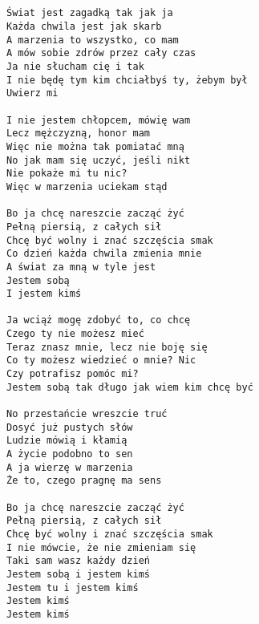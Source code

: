 \documentclass[12pt]{article}
\begin{document}
\subsection*{}
\begin{verbatim}
Świat jest zagadką tak jak ja
Każda chwila jest jak skarb
A marzenia to wszystko, co mam
A mów sobie zdrów przez cały czas
Ja nie słucham cię i tak
I nie będę tym kim chciałbyś ty, żebym był
Uwierz mi

I nie jestem chłopcem, mówię wam
Lecz mężczyzną, honor mam
Więc nie można tak pomiatać mną
No jak mam się uczyć, jeśli nikt
Nie pokaże mi tu nic?
Więc w marzenia uciekam stąd

Bo ja chcę nareszcie zacząć żyć
Pełną piersią, z całych sił
Chcę być wolny i znać szczęścia smak
Co dzień każda chwila zmienia mnie
A świat za mną w tyle jest
Jestem sobą
I jestem kimś

Ja wciąż mogę zdobyć to, co chcę
Czego ty nie możesz mieć
Teraz znasz mnie, lecz nie boję się
Co ty możesz wiedzieć o mnie? Nic
Czy potrafisz pomóc mi?
Jestem sobą tak długo jak wiem kim chcę być

No przestańcie wreszcie truć
Dosyć już pustych słów
Ludzie mówią i kłamią
A życie podobno to sen
A ja wierzę w marzenia
Że to, czego pragnę ma sens

Bo ja chcę nareszcie zacząć żyć
Pełną piersią, z całych sił
Chcę być wolny i znać szczęścia smak
I nie mówcie, że nie zmieniam się
Taki sam wasz każdy dzień
Jestem sobą i jestem kimś
Jestem tu i jestem kimś
Jestem kimś
Jestem kimś
\end{verbatim}
\clearpage
\end{document}
